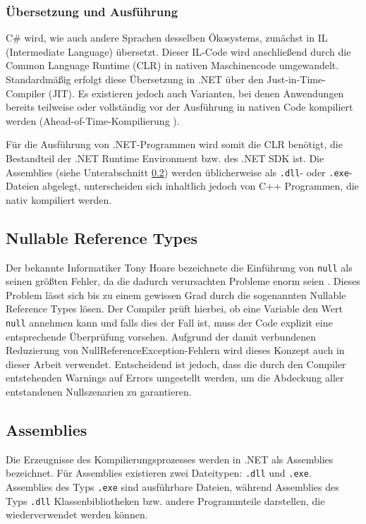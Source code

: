 \subsubsection{Übersetzung und Ausführung}
C\# wird, wie auch andere Sprachen desselben Ökosystems, zunächst in IL (Intermediate Language) übersetzt. Dieser IL-Code wird anschließend durch die Common Language Runtime (CLR) \cite{microsoft-clr-overview} in nativen Maschinencode umgewandelt. Standardmäßig erfolgt diese Übersetzung in .NET über den Just-in-Time-Compiler (JIT). Es existieren jedoch auch Varianten, bei denen Anwendungen bereits teilweise oder vollständig vor der Ausführung in nativen Code kompiliert werden (Ahead-of-Time-Kompilierung \cite{microsoft-native-aot}).

Für die Ausführung von .NET-Programmen wird somit die CLR benötigt, die Bestandteil der .NET Runtime Environment bzw. des .NET SDK ist. Die Assemblies (siehe Unterabschnitt \ref{subsec:assemblies}) werden üblicherweise als \texttt{.dll}- oder \texttt{.exe}-Dateien abgelegt, unterscheiden sich inhaltlich jedoch von C++ Programmen, die nativ kompiliert werden.

\subsection{Nullable Reference Types}
Der bekannte Informatiker Tony Hoare bezeichnete die Einführung von \texttt{null} als seinen größten Fehler, da die dadurch verursachten Probleme enorm seien \cite{hoare_null_video}. Dieses Problem lässt sich bis zu einem gewissen Grad durch die sogenannten Nullable Reference Types \cite{microsoft-nullable-references} lösen. Der Compiler prüft hierbei, ob eine Variable den Wert \texttt{null} annehmen kann und falls dies der Fall ist, muss der Code explizit eine entsprechende Überprüfung vorsehen. Aufgrund der damit verbundenen Reduzierung von NullReferenceException-Fehlern wird dieses Konzept auch in dieser Arbeit verwendet. Entscheidend ist jedoch, dass die durch den Compiler entstehenden Warnings auf Errors umgestellt werden, um die Abdeckung aller entstandenen Nullszenarien zu garantieren.

\subsection{Assemblies}
\label{subsec:assemblies}
Die Erzeugnisse des Kompilierungsprozesses werden in .NET als Assemblies \cite{msdn_assembly_manifest} bezeichnet. Für Assemblies existieren zwei Dateitypen: \texttt{.dll} und \texttt{.exe}. Assemblies des Typs \texttt{.exe} sind ausführbare Dateien, während Assemblies des Typs \texttt{.dll} Klassenbibliotheken bzw. andere Programmteile darstellen, die wiederverwendet werden können.

